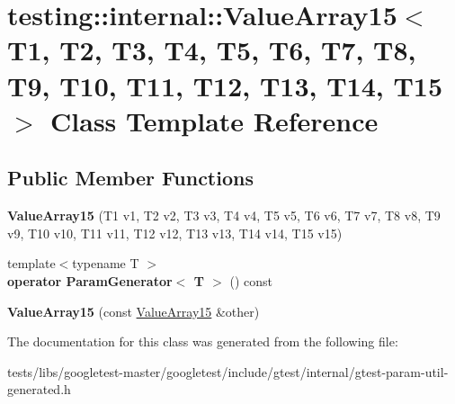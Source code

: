 \hypertarget{classtesting_1_1internal_1_1ValueArray15}{}\section{testing\+:\+:internal\+:\+:Value\+Array15$<$ T1, T2, T3, T4, T5, T6, T7, T8, T9, T10, T11, T12, T13, T14, T15 $>$ Class Template Reference}
\label{classtesting_1_1internal_1_1ValueArray15}
\subsection*{Public Member Functions}
\begin{DoxyCompactItemize}
\item 
\mbox{\label{classtesting_1_1internal_1_1ValueArray15_a2f9c6670b744cb08587bea1b50e169b4}} 
{\bfseries Value\+Array15} (T1 v1, T2 v2, T3 v3, T4 v4, T5 v5, T6 v6, T7 v7, T8 v8, T9 v9, T10 v10, T11 v11, T12 v12, T13 v13, T14 v14, T15 v15)
\item 
\mbox{\label{classtesting_1_1internal_1_1ValueArray15_ab5a77c335c83ef3f99e3133c2213c495}} 
{\footnotesize template$<$typename T $>$ }\\{\bfseries operator Param\+Generator$<$ T $>$} () const
\item 
\mbox{\label{classtesting_1_1internal_1_1ValueArray15_ab08ee6de70a42bc580229cc32635fa5c}} 
{\bfseries Value\+Array15} (const \hyperlink{classtesting_1_1internal_1_1ValueArray15}{Value\+Array15} \&other)
\end{DoxyCompactItemize}


The documentation for this class was generated from the following file\+:\begin{DoxyCompactItemize}
\item 
tests/libs/googletest-\/master/googletest/include/gtest/internal/gtest-\/param-\/util-\/generated.\+h\end{DoxyCompactItemize}
